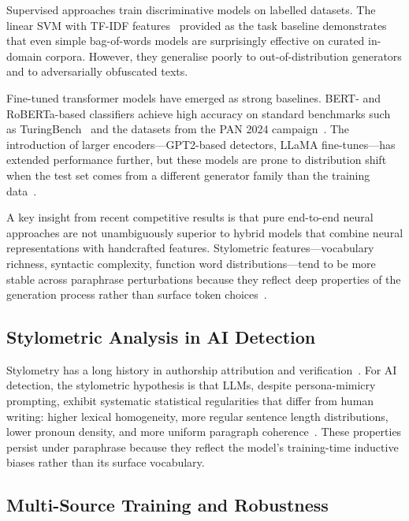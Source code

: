 Supervised approaches train discriminative models on labelled datasets. The linear SVM
with TF-IDF features~\cite{bevendorff:2025} provided as the task baseline demonstrates
that even simple bag-of-words models are surprisingly effective on curated in-domain
corpora. However, they generalise poorly to out-of-distribution generators and to
adversarially obfuscated texts.

Fine-tuned transformer models have emerged as strong baselines. BERT- and RoBERTa-based
classifiers achieve high accuracy on standard benchmarks such as
TuringBench~\cite{uchendu:2021} and the datasets from the PAN 2024
campaign~\cite{bevendorff:2024b}. The introduction of larger encoders—GPT2-based detectors,
LLaMA fine-tunes—has extended performance further, but these models are prone to
distribution shift when the test set comes from a different generator family than the
training data~\cite{schuster:2020,sadasivan:2023}.

A key insight from recent competitive results is that pure end-to-end neural approaches
are not unambiguously superior to hybrid models that combine neural representations
with handcrafted features. Stylometric features—vocabulary richness, syntactic
complexity, function word distributions—tend to be more stable across paraphrase
perturbations because they reflect deep properties of the generation process rather
than surface token choices~\cite{bevendorff:2025b,uchendu:2020}.

\subsection{Stylometric Analysis in AI Detection}

Stylometry has a long history in authorship attribution and verification~\cite{koppel:2004,
bevendorff:2019}. For AI detection, the stylometric hypothesis is that LLMs, despite
persona-mimicry prompting, exhibit systematic statistical regularities that differ from
human writing: higher lexical homogeneity, more regular sentence length distributions,
lower pronoun density, and more uniform paragraph coherence~\cite{jakesch:2023,
schuster:2020}. These properties persist under paraphrase because they reflect the
model's training-time inductive biases rather than its surface vocabulary.

\subsection{Multi-Source Training and Robustness}

